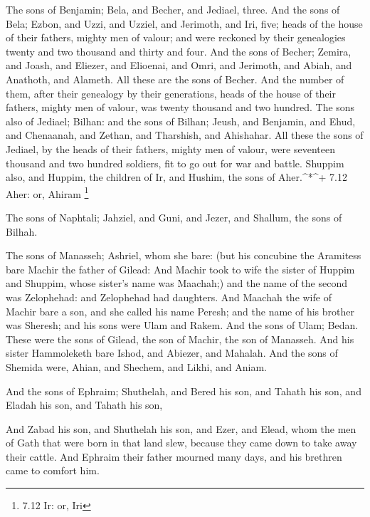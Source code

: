  The sons of Benjamin; Bela, and Becher, and Jediael, three.
 And the sons of Bela; Ezbon, and Uzzi, and Uzziel, and
Jerimoth, and Iri, five; heads of the house of their fathers, mighty men
of valour; and were reckoned by their genealogies twenty and two
thousand and thirty and four.  And the sons of Becher;
Zemira, and Joash, and Eliezer, and Elioenai, and Omri, and Jerimoth,
and Abiah, and Anathoth, and Alameth. All these are the sons of Becher.
 And the number of them, after their genealogy by their
generations, heads of the house of their fathers, mighty men of valour,
was twenty thousand and two hundred.  The sons also of
Jediael; Bilhan: and the sons of Bilhan; Jeush, and Benjamin, and Ehud,
and Chenaanah, and Zethan, and Tharshish, and Ahishahar. 
All these the sons of Jediael, by the heads of their fathers, mighty men
of valour, were seventeen thousand and two hundred soldiers, fit to go
out for war and battle.  Shuppim also, and Huppim, the
children of Ir, and Hushim, the sons of Aher.\^{}*\^{}+ 7.12 Aher: or,
Ahiram \footnote{7.12 Ir: or, Iri}

 The sons of Naphtali; Jahziel, and Guni, and Jezer, and
Shallum, the sons of Bilhah.

 The sons of Manasseh; Ashriel, whom she bare: (but his
concubine the Aramitess bare Machir the father of Gilead: 
And Machir took to wife the sister of Huppim and Shuppim, whose sister's
name was Maachah;) and the name of the second was Zelophehad: and
Zelophehad had daughters.  And Maachah the wife of Machir
bare a son, and she called his name Peresh; and the name of his brother
was Sheresh; and his sons were Ulam and Rakem.  And the
sons of Ulam; Bedan. These were the sons of Gilead, the son of Machir,
the son of Manasseh.  And his sister Hammoleketh bare
Ishod, and Abiezer, and Mahalah.  And the sons of Shemida
were, Ahian, and Shechem, and Likhi, and Aniam.

 And the sons of Ephraim; Shuthelah, and Bered his son, and
Tahath his son, and Eladah his son, and Tahath his son,

 And Zabad his son, and Shuthelah his son, and Ezer, and
Elead, whom the men of Gath that were born in that land slew, because
they came down to take away their cattle.  And Ephraim
their father mourned many days, and his brethren came to comfort him.

